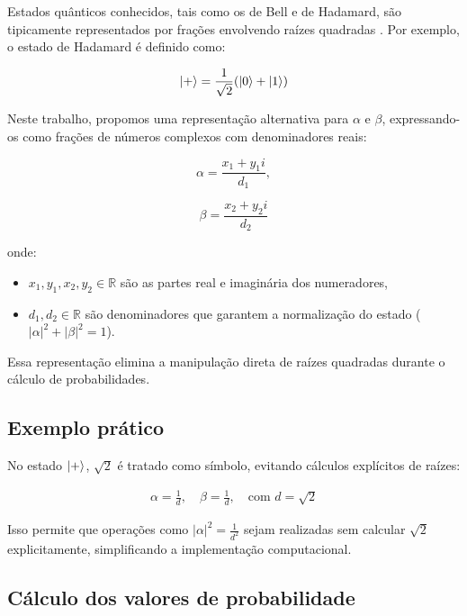 \documentclass[12pt, a4paper]{article}
\begin{document}
Estados quânticos conhecidos, tais como os de Bell e de Hadamard, são tipicamente representados por frações envolvendo raízes quadradas \cite{nielsen2010, preskill1998}. Por exemplo, o estado de Hadamard é definido como:

\begin{equation}
\ket{+} = \frac{1}{\sqrt{2}}(\ket{0} + \ket{1})
\label{eq:hadamard}
\end{equation}

Neste trabalho, propomos uma representação alternativa para \(\alpha\) e \(\beta\), expressando-os como frações de números complexos com denominadores reais:

\begin{equation}
\alpha = \frac{x_1 + y_1 i}{d_1},
\label{eq:alpha}
\end{equation}

\begin{equation}
\beta = \frac{x_2 + y_2 i}{d_2}
\label{eq:beta}
\end{equation}

onde:

\begin{itemize}
\item \(x_1, y_1, x_2, y_2 \in \mathbb{R}\) são as partes real e imaginária dos numeradores,
\item \(d_1, d_2 \in \mathbb{R}\) são denominadores que garantem a normalização do estado (\(|\alpha|^2 + |\beta|^2 = 1\)).
\end{itemize}

Essa representação elimina a manipulação direta de raízes quadradas durante o cálculo de probabilidades.

\subsection*{Exemplo prático}

No estado \(\ket{+}\), \(\sqrt{2}\) é tratado como símbolo, evitando cálculos explícitos de raízes:

\begin{align*}
\alpha = \frac{1}{d}, \quad \beta = \frac{1}{d}, \quad \text{com } d = \sqrt{2}
\end{align*}

Isso permite que operações como \(|\alpha|^2=\frac{1}{d^2}\) sejam realizadas sem calcular \(\sqrt{2}\) explicitamente, simplificando a implementação computacional.

\subsection{Cálculo dos valores de probabilidade}
\end{document}

